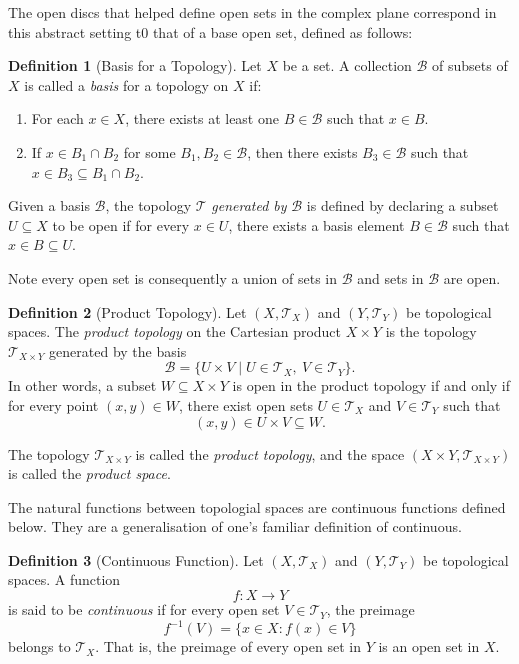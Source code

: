 \documentclass{article}
\theoremstyle{definition}
\newtheorem{definition}{Definition}[section]
\theoremstyle{definition}
\theoremstyle{definition}
\begin{document}
The open discs that helped define open sets in the complex plane correspond in this abstract setting t0 that of a base open set, defined as follows:

\begin{definition}[Basis for a Topology]
Let $X$ be a set. A collection $\mathcal{B}$ of subsets of $X$ is called a \emph{basis} for a topology on $X$ if:

\begin{enumerate}
    \item For each $x \in X$, there exists at least one $B \in \mathcal{B}$ such that $x \in B$.
    \item If $x \in B_1 \cap B_2$ for some $B_1, B_2 \in \mathcal{B}$, then there exists $B_3 \in \mathcal{B}$ such that $x \in B_3 \subseteq B_1 \cap B_2$.
\end{enumerate}

Given a basis $\mathcal{B}$, the topology $\mathcal{T}$ \emph{generated by} $\mathcal{B}$ is defined by declaring a subset $U \subseteq X$ to be open if for every $x \in U$, there exists a basis element $B \in \mathcal{B}$ such that $x \in B \subseteq U$.

Note every open set is consequently a union of sets in $\mathcal{B}$ and sets in $\mathcal{B}$ are open. 
\end{definition}


\begin{definition}[Product Topology]
Let $(X, \mathcal{T}_X)$ and $(Y, \mathcal{T}_Y)$ be topological spaces. The \emph{product topology} on the Cartesian product $X \times Y$ is the topology $\mathcal{T}_{X \times Y}$ generated by the basis
\[
\mathcal{B} = \{ U \times V \mid U \in \mathcal{T}_X,\ V \in \mathcal{T}_Y \}.
\]
In other words, a subset $W \subseteq X \times Y$ is open in the product topology if and only if for every point $(x, y) \in W$, there exist open sets $U \in \mathcal{T}_X$ and $V \in \mathcal{T}_Y$ such that
\[
(x, y) \in U \times V \subseteq W.
\]

The topology $\mathcal{T}_{X \times Y}$ is called the \emph{product topology}, and the space $(X \times Y, \mathcal{T}_{X \times Y})$ is called the \emph{product space}.
\end{definition}

The natural functions between topologial spaces are continuous functions defined below. They are a generalisation of one's familiar definition of continuous.

\begin{definition}[Continuous Function] Let \( (X, \mathcal{T}_X) \) and \( (Y, \mathcal{T}_Y) \) be topological spaces. A function
\[
f : X \to Y
\]
is said to be \emph{continuous} if for every open set \( V \in \mathcal{T}_Y \), the preimage
\[
f^{-1}(V) = \{ x \in X : f(x) \in V \}
\]
belongs to \( \mathcal{T}_X \). That is, the preimage of every open set in \( Y \) is an open set in \( X \).

    
\end{definition}
\end{document}
